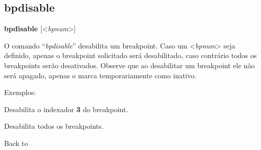 \documentclass[letterpaper,10pt,brazil]{sphinxmanual}
\begin{document}
\subsection{bpdisable}
\label{debugger/breakpoint:debugger-command-bpdisable}\label{debugger/breakpoint:bpdisable}
\begin{DUlineblock}{0em}
\item[]
\begin{DUlineblock}{\DUlineblockindent}
\item[] \textbf{bpdisable} {[}\textless{}\emph{bpnum}\textgreater{}{]}
\item[] 
\end{DUlineblock}
\item[] O comando ``\emph{bpdisable}'' desabilita um breakpoint. Caso um \textless{}\emph{bpnum}\textgreater{} seja definido, apenas o breakpoint solicitado será desabilitado, caso contrário todos os breakpoints serão desativados. Observe que ao desabilitar um breakpoint ele não será apagado, apenas o marca temporariamente como inativo.
\item[] 
\item[] Exemplos:
\item[] 
\item[]
\begin{DUlineblock}{\DUlineblockindent}
\item[] 
\item[] 
\end{DUlineblock}
\item[] Desabilita o indexador \textbf{3} do breakpoint.
\item[] 
\item[]
\begin{DUlineblock}{\DUlineblockindent}
\item[] 
\item[] 
\end{DUlineblock}
\item[] Desabilita todos os breakpoints.
\item[] 
\item[] Back to {\hyperref[debugger/breakpoint:debugger\string-breakpoint\string-list]{}}
\end{DUlineblock}
\begin{quote}
\label{debugger/breakpoint:debugger-command-bpenable}\end{quote}
\end{document}
